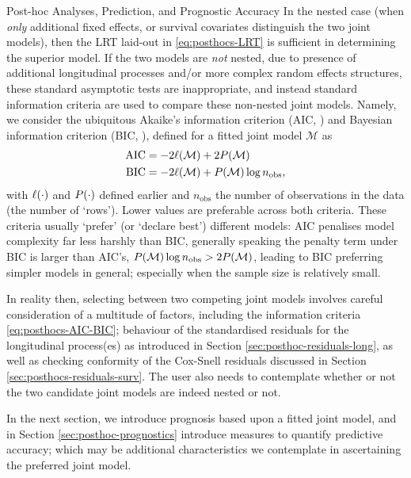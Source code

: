 \begin{chapter}{\label{cha:posthoc}Post-hoc Analyses, Prediction, and Prognostic Accuracy}
In the nested case (\eg when \textit{only} additional fixed effects, or survival covariates distinguish the two joint models), then the LRT laid-out in \eqref{eq:posthocs-LRT} is sufficient in determining the superior model. If the two models are \textit{not} nested, due to presence of additional longitudinal processes and/or more complex random effects structures, these standard asymptotic tests are inappropriate, and instead standard information criteria are used to compare these non-nested joint models. Namely, we consider the ubiquitous Akaike's information criterion (AIC, \citet{Akaike1974}) and Bayesian information criterion (BIC, \citet{Schwarz1978}), defined for a fitted joint model $\mathcal{M}$ as
\begin{equation}
    \begin{aligned}
        \mathrm{AIC} &= -2\ell\!\left(\cal M\right) + 2P\!\left(\cal M\right)\\
        \mathrm{BIC} &= -2\ell\!\left(\cal M\right) + P\!\left(\cal M\right)\log n_{\rm obs},
    \end{aligned}
\label{eq:posthocs-AIC-BIC}
\end{equation}
with $\ell\!\left(\cdot\right)$ and $P\!\left(\cdot\right)$ defined earlier and $n_{\mathrm{obs}}$ the number of observations in the data (\ie the number of `rows'). Lower values are preferable across both criteria. These criteria usually `prefer' (or `declare best') different models: AIC penalises model complexity far less harshly than BIC, \ie generally speaking the penalty term under BIC is larger than AIC's, $P\!\left(\cal M\right)\log n_{\rm obs} > 2P\!\left(\cal M\right)$, leading to BIC preferring simpler models in general; especially when the sample size is relatively small.

In reality then, selecting between two competing joint models involves careful consideration of a multitude of factors, including the information criteria \eqref{eq:posthocs-AIC-BIC}; behaviour of the standardised residuals for the longitudinal process(es) as introduced in Section \ref{sec:posthoc-residuals-long}, as well as checking conformity of the Cox-Snell residuals discussed in Section \ref{sec:posthocs-residuals-surv}. The user also needs to contemplate whether or not the two candidate joint models are indeed nested or not. 

In the next section, we introduce prognosis based upon a fitted joint model, and in Section \ref{sec:posthoc-prognostics} introduce measures to quantify predictive accuracy; which may be additional characteristics we contemplate in ascertaining the preferred joint model.


\end{chapter}
